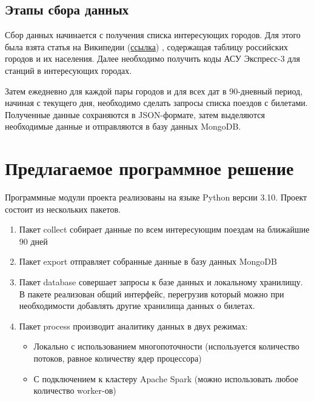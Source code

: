 \documentclass[conference]{IEEEtran}
\begin{document}
\subsection{Этапы сбора данных}

Сбор данных начинается с получения списка интересующих городов. Для этого была взята статья на Википедии (\href{https://ru.wikipedia.org/wiki/\%D0\%A1\%D0\%BF\%D0\%B8\%D1\%81\%D0\%BE\%D0\%BA\_\%D0\%B3\%D0\%BE\%D1\%80\%D0\%BE\%D0\%B4\%D0\%BE\%D0\%B2\_\%D0\%A0\%D0\%BE\%D1\%81\%D1\%81\%D0\%B8\%D0\%B8\_\%D1\%81\_\%D0\%BD\%D0\%B0\%D1\%81\%D0\%B5\%D0\%BB\%D0\%B5\%D0\%BD\%D0\%B8\%D0\%B5\%D0\%BC\_\%D0\%B1\%D0\%BE\%D0\%BB\%D0\%B5\%D0\%B5\_100\_\%D1\%82\%D1\%8B\%D1\%81\%D1\%8F\%D1\%87\_\%D0\%B6\%D0\%B8\%D1\%82\%D0\%B5\%D0\%BB\%D0\%B5\%D0\%B9}{ссылка})
, содержащая таблицу российских городов и их населения. Далее необходимо получить коды АСУ Экспресс-3 для станций в интересующих городах.

Затем ежедневно для каждой пары городов и для всех дат в 90-дневный период, начиная с текущего дня, необходимо сделать запросы списка поездов с билетами. Полученные данные сохраняются в JSON-формате, затем выделяются необходимые данные и отправляются в базу данных MongoDB.

\section{Предлагаемое программное решение}

Программные модули проекта реализованы на языке Python версии 3.10. Проект состоит из нескольких пакетов.

\begin{enumerate}
	\item Пакет collect собирает данные по всем интересующим поездам на ближайшие 90 дней
	
	\item Пакет export отправляет собранные данные в базу данных MongoDB
	
	\item Пакет database совершает запросы к базе данных и локальному хранилищу. В пакете реализован общий интерфейс, перегрузив который можно при необходимости добавлять другие хранилища данных о билетах.
	
	\item Пакет process производит аналитику данных в двух режимах:
	
	\begin{itemize}
		\item Локально с использованием многопоточности (используется количество потоков, равное количеству ядер процессора)
		
		\item С подключением к кластеру Apache Spark (можно использовать любое количество worker-ов)
	\end{itemize}
\end{enumerate}
\end{document}

